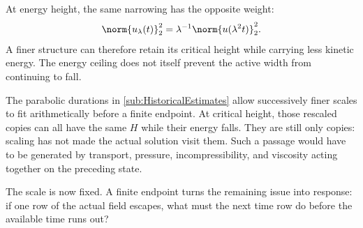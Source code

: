 At energy height, the same narrowing has the opposite weight:
\[
  \norm{u_\lambda(t)}_2^2
  =
  \lambda^{-1}
  \norm{u(\lambda^2t)}_2^2.
\]
A finer structure can therefore retain its critical height while carrying less
kinetic energy.  The energy ceiling does not itself prevent the active width
from continuing to fall.

The parabolic durations in \cref{sub:HistoricalEstimates} allow successively
finer scales to fit arithmetically before a finite endpoint.  At critical
height, those rescaled copies can all have the same \(H\) while their energy
falls.  They are still only copies: scaling has not made the actual solution
visit them.  Such a passage would have to be generated by transport, pressure,
incompressibility, and viscosity acting together on the preceding state.

The scale is now fixed.  A finite endpoint turns the remaining issue into
response: if one row of the actual field escapes, what must the next time row do
before the available time runs out?
